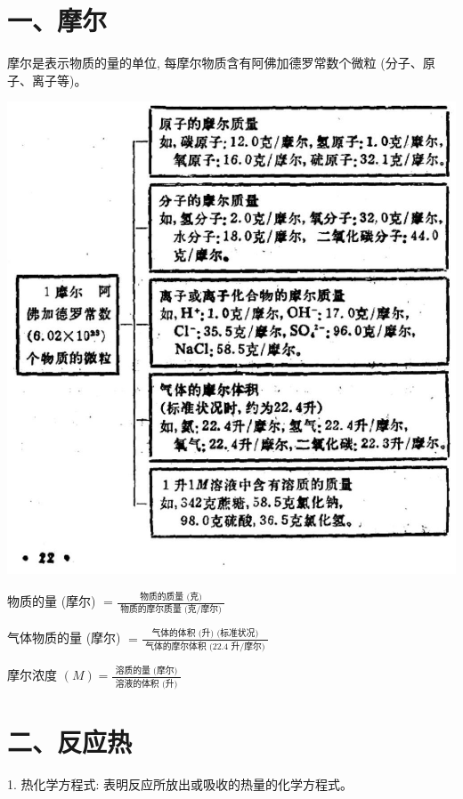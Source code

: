 \documentclass[10pt]{article}
\begin{document}
\section*{一、摩尔}

摩尔是表示物质的量的单位, 每摩尔物质含有阿佛加德罗常数个微粒 (分子、原子、离子等)。

\begin{center}
\includegraphics[max width=1.0\textwidth]{images/01912d0f-097c-7e75-8f32-4f326cd86c9f_29_101167.jpg}
\end{center}

物质的量 (摩尔) \(= \frac{\text{ 物质的质量 (克) }}{\text{ 物质的摩尔质量 (克/摩尔) }}\)

气体物质的量 (摩尔) \(= \frac{\text{ 气体的体积 (升) (标准状况) }}{\text{ 气体的摩尔体积 (22.4 升/摩尔) }}\)

摩尔浓度 \(\left( M\right) = \frac{\text{ 溶质的量 (摩尔) }}{\text{ 溶液的体积 (升) }}\)

\section*{二、反应热}

1. 热化学方程式: 表明反应所放出或吸收的热量的化学方程式。
\end{document}
